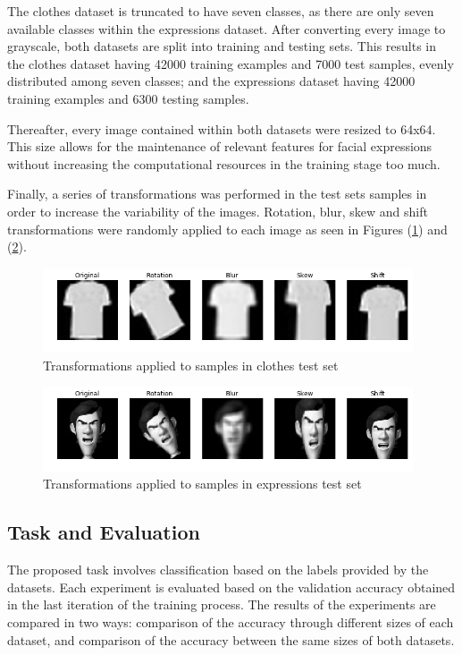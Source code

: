 \documentclass{article}
\begin{document}
The clothes dataset is truncated to have seven classes, as there are only seven available classes within the expressions dataset. After converting every image to grayscale, both datasets are split into training and testing sets. This results in the clothes dataset having 42000 training examples and 7000 test samples, evenly distributed among seven classes; and the expressions dataset having 42000 training examples and 6300 testing samples.

Thereafter, every image contained within both datasets were resized to 64x64. This size allows for the maintenance of relevant features for facial expressions without increasing the computational resources in the training stage too much.

Finally, a series of transformations was performed in the test sets samples in order to increase the variability of the images. Rotation, blur, skew and shift transformations were randomly applied to each image as seen in Figures (\ref{fig:3}) and (\ref{fig:4}).

\begin{figure}[!htb]
	\vskip 5mm
		\begin{center}
			\includegraphics[height=2.5cm]{augmented_clothes}
			\caption{Transformations applied to samples in clothes test set}
			\label{fig:3}
		\end{center}
	\vskip -5mm
\end{figure}

\begin{figure}[!htb]
	\vskip 5mm
		\begin{center}
			\includegraphics[height=2.5cm]{augmented_expressions}
			\caption{Transformations applied to samples in expressions test set}
			\label{fig:4}
		\end{center}
	\vskip -5mm
\end{figure}

\subsection{Task and Evaluation}
\label{sec:evaluation}
The proposed task involves classification based on the labels provided by the datasets. Each experiment is evaluated based on the validation accuracy obtained in the last iteration of the training process. The results of the experiments are compared in two ways: comparison of the accuracy through different sizes of each dataset, and comparison of the accuracy between the same sizes of both datasets.
\end{document}
